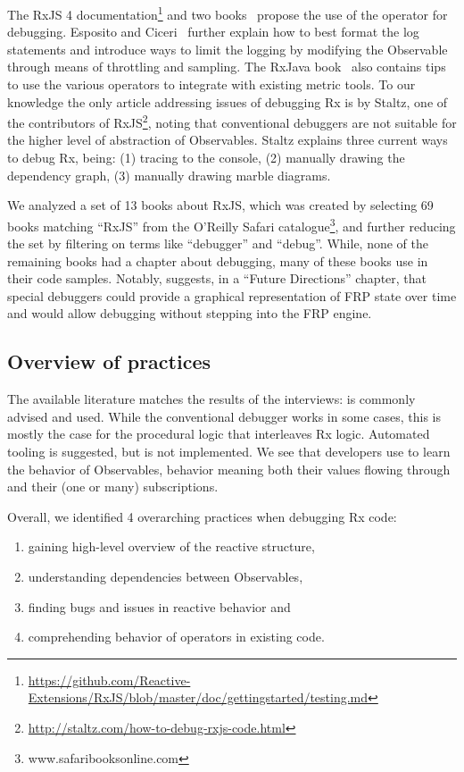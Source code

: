 The RxJS 4 documentation\footnote{
	\url{https://github.com/Reactive-Extensions/RxJS/blob/master/doc/gettingstarted/testing.md}
} and two books~\cite{esposito2016reactive,rxjavabook2016} propose the use of the  operator for debugging. Esposito and Ciceri~\cite{esposito2016reactive} further explain how to best format the log statements and introduce ways to limit the logging by modifying the Observable through means of throttling and sampling. The RxJava book~\cite{rxjavabook2016} also contains tips to use the various  operators to integrate with existing metric tools.
To our knowledge the only article addressing issues of debugging Rx is by Staltz, one of the contributors of RxJS\footnote{\url{http://staltz.com/how-to-debug-rxjs-code.html}}, noting that conventional debuggers are not suitable for the higher level of abstraction of Observables. Staltz explains three current ways to debug Rx, being: (1) tracing to the console, (2) manually drawing the dependency graph, (3) manually drawing marble diagrams.

We analyzed a set of 13 books about RxJS, which was created by selecting 69 books matching ``RxJS'' from the O'Reilly Safari catalogue\footnote{www.safaribooksonline.com}, and further reducing the set by filtering on terms like ``debugger'' and ``debug''. While, none of the remaining books had a chapter about debugging, many of these books use \printfdebugging{} in their code samples. Notably, \cite{frpbook2016} suggests, in a ``Future Directions'' chapter, that special debuggers could provide a graphical representation of FRP state over time and would allow debugging without stepping into the FRP engine.

\subsection{Overview of practices}
The available literature matches the results of the interviews: \printfdebugging{} is commonly advised and used. While the conventional debugger works in some cases, this is mostly the case for the procedural logic that interleaves Rx logic. Automated tooling is suggested, but is not implemented. We see that developers use \printfdebugging{} to learn the behavior of Observables, behavior meaning both their values flowing through and their (one or many) subscriptions. 

Overall, we identified 4 overarching practices when debugging Rx code:
\begin{enumerate}
\itemsep0em 
\item[(1)] gaining high-level overview of the reactive structure,
\item[(2)] understanding dependencies between Observables,
\item[(3)] finding bugs and issues in reactive behavior and
\item[(4)] comprehending behavior of operators in existing code.
\end{enumerate}